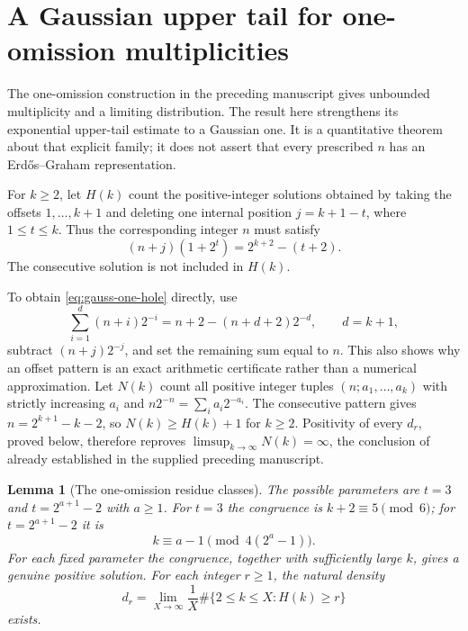 \documentclass[11pt,a4paper]{article}
\newtheorem{lemma}[theorem]{Lemma}
\theoremstyle{definition}
\theoremstyle{remark}\newtheorem{remark}[theorem]{Remark}
\begin{document}
\section{A Gaussian upper tail for one-omission multiplicities}
\label{sec:gaussian-omissions}

The one-omission construction in the preceding manuscript gives unbounded
multiplicity and a limiting distribution.  The result here strengthens its
exponential upper-tail estimate to a Gaussian one.  It is a quantitative
theorem about that explicit family; it does not assert that every prescribed
$n$ has an Erd\H{o}s--Graham representation.

For $k\geq2$, let $H(k)$ count the positive-integer solutions obtained by
taking the offsets $1,\ldots,k+1$ and deleting one internal position
$j=k+1-t$, where $1\leq t\leq k$.  Thus the corresponding integer $n$ must
satisfy
\begin{equation}\label{eq:gauss-one-hole}
 (n+j)(1+2^t)=2^{k+2}-(t+2).
\end{equation}
The consecutive solution is not included in $H(k)$.

To obtain \eqref{eq:gauss-one-hole} directly, use
\[
 \sum_{i=1}^{d}(n+i)2^{-i}
 =n+2-(n+d+2)2^{-d},\qquad d=k+1,
\]
subtract $(n+j)2^{-j}$, and set the remaining sum equal to $n$.
This also shows why an offset pattern is an exact arithmetic
certificate rather than a numerical approximation.
Let $N(k)$ count all positive integer tuples
$(n;a_1,\ldots,a_k)$ with strictly increasing $a_i$ and
$n2^{-n}=\sum_i a_i2^{-a_i}$. The consecutive pattern gives
$n=2^{k+1}-k-2$, so $N(k)\ge H(k)+1$ for $k\ge2$.
Positivity of every $d_r$, proved below, therefore reproves
$\limsup_{k\to\infty}N(k)=\infty$, the conclusion of
\cite[Conjecture~3.3]{TUZ2020} already established in the supplied
preceding manuscript.

\begin{lemma}[The one-omission residue classes]
\label{lem:gauss-classes}
The possible parameters are $t=3$ and $t=2^{a+1}-2$ with $a\geq1$.
For $t=3$ the congruence is $k+2\equiv5\pmod6$; for
$t=2^{a+1}-2$ it is
\begin{equation}\label{eq:gauss-residue}
 k\equiv a-1\pmod {4(2^a-1)}.
\end{equation}
For each fixed parameter the congruence, together with sufficiently large
$k$, gives a genuine positive solution.  For each integer $r\geq1$, the
natural density
\[
 d_r=\lim_{X\to\infty}\frac1X\#\{2\leq k\leq X:H(k)\geq r\}
\]
exists.
\end{lemma}
\end{document}
